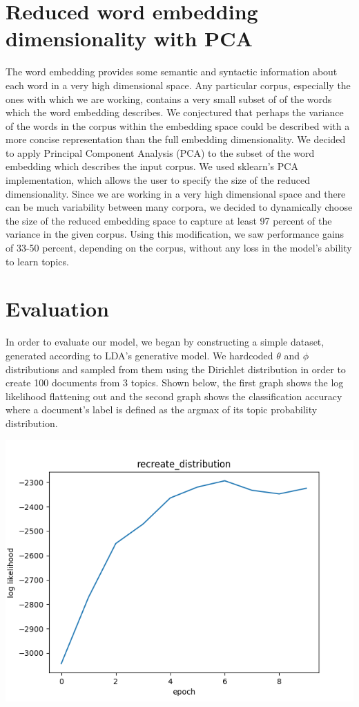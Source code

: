 \documentclass[letterpaper, 11pt]{article}
\begin{document}
\begin{multicols}{2}
\section{Reduced word embedding dimensionality with PCA}
The word embedding provides some semantic and syntactic information about each word in a very high
dimensional space.
Any particular corpus, especially the ones with which we are working, contains a very small subset of
of the words which the word embedding describes.
We conjectured that perhaps the variance of the words in the corpus within the embedding space
could be described with a more concise representation than the full embedding dimensionality.
We decided to apply Principal Component Analysis (PCA) to the subset of the word embedding which describes
the input corpus.
We used sklearn's PCA implementation, which allows the user to specify the size of the reduced
dimensionality.
Since we are working in a very high dimensional space and there can be much variability between
many corpora, we decided to dynamically choose the size of the reduced embedding space to capture
at least 97 percent of the variance in the given corpus.
Using this modification, we saw performance gains of 33-50 percent, depending on the corpus, without
any loss in the model's ability to learn topics.

\section{Evaluation}
In order to evaluate our model, we began by constructing a simple dataset, generated according to
LDA’s generative model.
We hardcoded $\theta$ and $\phi$ distributions and sampled from them using the Dirichlet
distribution in order to create 100 documents from 3 topics.
Shown below, the first graph shows the log likelihood flattening out and the second graph shows the
classification accuracy where a document’s label is defined as the argmax of its topic probability
distribution.

\begin{center}
\includegraphics[scale=.3]{log_likelihood}
\end{center}


\end{multicols}
\end{document}
